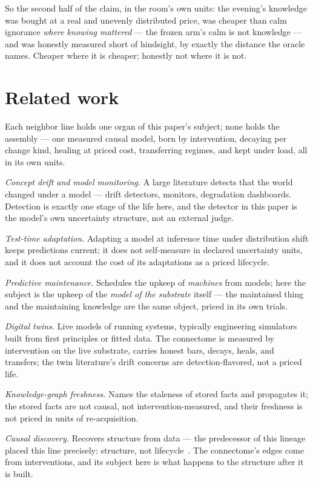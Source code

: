 \documentclass[11pt,a4paper]{article}
\begin{document}
So the second half of the claim, in the room's own units: the
evening's knowledge was bought at a real and unevenly distributed
price, was cheaper than calm ignorance \emph{where knowing mattered}
--- the frozen arm's calm is not knowledge --- and was honestly
measured short of hindsight, by exactly the distance the oracle
names. Cheaper where it is cheaper; honestly not where it is not.

\section{Related work}
\label{sec:related}

Each neighbor line holds one organ of this paper's subject; none
holds the assembly --- one measured causal model, born by
intervention, decaying per change kind, healing at priced cost,
transferring regimes, and kept under load, all in its own units.

\emph{Concept drift and model monitoring.} A large literature
detects that the world changed under a model --- drift detectors,
monitors, degradation dashboards. Detection is exactly one stage of
the life here, and the detector in this paper is the model's own
uncertainty structure, not an external judge.

\emph{Test-time adaptation.} Adapting a model at inference time
under distribution shift keeps predictions current; it does not
self-measure in declared uncertainty units, and it does not account
the cost of its adaptations as a priced lifecycle.

\emph{Predictive maintenance.} Schedules the upkeep of
\emph{machines} from models; here the subject is the upkeep of the
\emph{model of the substrate} itself --- the maintained thing and
the maintaining knowledge are the same object, priced in its own
trials.

\emph{Digital twins.} Live models of running systems, typically
engineering simulators built from first principles or fitted data.
The connectome is measured by intervention on the live substrate,
carries honest bars, decays, heals, and transfers; the twin
literature's drift concerns are detection-flavored, not a priced
life.

\emph{Knowledge-graph freshness.} Names the staleness of stored
facts and propagates it; the stored facts are not causal, not
intervention-measured, and their freshness is not priced in units of
re-acquisition.

\emph{Causal discovery.} Recovers structure from data --- the
predecessor of this lineage placed this line precisely: structure,
not lifecycle~\cite{p2}. The connectome's edges come from
interventions, and its subject here is what happens to the structure
after it is built.
\end{document}
